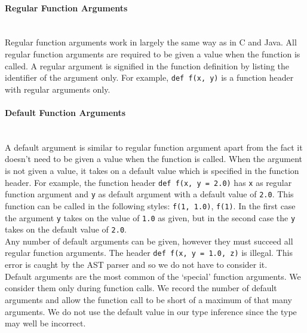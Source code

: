 \documentclass[12pt, titlepage]{article}
\begin{document}
\paragraph*{Regular Function Arguments}\mbox{} \\
Regular function arguments work in largely the same way as in C and Java. All regular function arguments are required to be given a value when the function is called. A regular argument is signified in the function definition by listing the identifier of the argument only. For example, \texttt{def f(x, y)} is a function header with regular arguments only.

\paragraph*{Default Function Arguments}\mbox{} \\
A default argument is similar to regular function argument apart from the fact it doesn't need to be given a value when the function is called. When the argument is not given a value, it takes on a default value which is specified in the function header. For example, the function header \texttt{def f(x, y = 2.0)} has \texttt{x} as regular function argument and \texttt{y} as default argument with a default value of \texttt{2.0}. This function can be called in the following styles: \texttt{f(1, 1.0)}, \texttt{f(1)}. In the first case the argument \texttt{y} takes on the value of \texttt{1.0} as given, but in the second case the \texttt{y} takes on the default value of \texttt{2.0}. \\
\indent Any number of default arguments can be given, however they must succeed all regular function arguments. The header \texttt{def f(x, y = 1.0, z)} is illegal. This error is caught by the AST parser and so we do not have to consider it. \\
\indent Default arguments are the most common of the `special' function arguments. We consider them only during function calls. We record the number of default arguments and allow the function call to be short of a maximum of that many arguments. We do not use the default value in our type inference since the type may well be incorrect. \\
\end{document}
